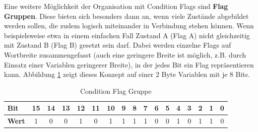 \documentclass{llncs}
\begin{document}
Eine weitere Möglichkeit der Organisation mit Condition Flags sind \textbf{Flag Gruppen}. Diese bieten sich besonders dann an, wenn viele Zustände abgebildet werden sollen, die zudem logisch miteinander in Verbindung stehen können. Wenn beispielsweise etwa in einem einfachen Fall Zustand A (Flag A) nicht gleichzeitig mit Zustand B (Flag B) gesetzt sein darf. Dabei werden einzelne Flags auf Wortbreite zusammengefasst \autocite[vgl.][85]{Cooling2017} (auch eine geringere Breite ist möglich, z.B. durch Einsatz einer Variablen geringerer Breite), in der jedes Bit ein Flag repräsentieren kann. Abbildung \ref{tab:FlagGroup} zeigt dieses Konzept auf einer 2 Byte Variablen mit je 8 Bits.\\
\begin{table}[h]
	\centering %
	\def\arraystretch{1.5} %
	\setlength{\tabcolsep}{0.5em} %
		\begin{tabular}[h]{|l|c|c|c|c|c|c|c|c|c|c|c|c|c|c|c|c|}
			\hline
			\textbf{Bit} & \cellcolor{hellgrau}15 & \cellcolor{hellgrau}14 & \cellcolor{hellgrau}13 & \cellcolor{hellgrau}12 & \cellcolor{hellgrau}11 & \cellcolor{hellgrau}10 & \cellcolor{hellgrau}9 & \cellcolor{hellgrau}8 & \cellcolor{hellgrau}7 & \cellcolor{hellgrau}6 & \cellcolor{hellgrau}5 & \cellcolor{hellgrau}4 & \cellcolor{hellgrau}3 & \cellcolor{hellgrau}2 & \cellcolor{hellgrau}1 & \cellcolor{hellgrau}0 \\
			\hline
			\textbf{Wert} & 1 & 0 & 0 & 1 & 0 & 1 & 1 & 1 & 1 & 0 & 0 & 1 & 0 & 1 & 1 & 0 \\
			\hline
	\end{tabular}%
	\caption{\label{tab:FlagGroup} Condition Flag Gruppe \autocite[vgl.][85]{Cooling2017}}
\end{table}
\end{document}
